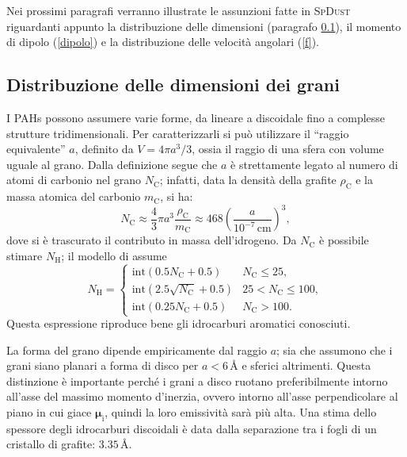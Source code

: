 Nei prossimi paragrafi verranno illustrate le assunzioni fatte in \textsc{SpDust} riguardanti appunto la distribuzione delle dimensioni (paragrafo \ref{size}), il momento di dipolo (\ref{dipolo}) e la distribuzione delle velocità angolari (\ref{f}).

\subsection{Distribuzione delle dimensioni dei grani}
\label{size}
I PAHs possono assumere varie forme, da lineare a discoidale fino a complesse strutture tridimensionali. Per caratterizzarli si può utilizzare il ``raggio equivalente'' $a$, definito da $V=4\pi a^{3}/3$, ossia il raggio di una sfera con volume uguale al grano.
Dalla definizione segue che $a$ è strettamente legato al numero di atomi di carbonio nel grano $N_{\mathrm{C}}$; infatti, data la densità della grafite $\rho_{\mathrm{C}}$ e la massa atomica del carbonio $m_{\mathrm{C}}$, si ha:
\begin{equation}
N_{\mathrm{C}} \approx \frac{4}{3} \pi a^3 \frac{\rho_{\mathrm{C}}}{m_{\mathrm{C}}} \approx 468 \left(\frac{a}{10^{-7}\,\mathrm{cm}}\right)^3,
\end{equation}
dove si è trascurato il contributo in massa dell'idrogeno. Da $N_{\mathrm{C}}$ è possibile stimare $N_{\mathrm{H}}$; il modello di \textcite{DLi} assume
\begin{equation}
N_{\mathrm{H}}=
	\begin{cases}
		\text{int} (0.5 N_{\mathrm{C}} + 0.5) & N_{\mathrm{C}}\leqslant 25,\\
		\text{int} (2.5\sqrt{N_{\mathrm{C}}}+0.5) & 25<N_{\mathrm{C}}\leqslant 100,\\
		\text{int} (0.25N_{\mathrm{C}}+0.5) & N_{\mathrm{C}}>100.
\end{cases}
\end{equation}
Questa espressione riproduce bene gli idrocarburi aromatici conosciuti.

La forma del grano dipende empiricamente dal raggio $a$; sia \textcite{DL98a} che \textcite{Ali} assumono che i grani siano planari a forma di disco per $a<6$\,\AA{} e sferici altrimenti. Questa distinzione è importante perché i grani a disco ruotano preferibilmente intorno all'asse del massimo momento d'inerzia, ovvero intorno all'asse perpendicolare al piano in cui giace $\boldsymbol{\mu}_{\mathrm{i}}$, quindi la loro emissività sarà più alta. Una stima dello spessore degli idrocarburi discoidali è data dalla separazione tra i fogli di un cristallo di grafite: $3.35$\,\AA{}.

